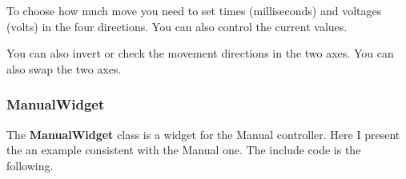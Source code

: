 To choose how much move you need to set times (milliseconds) and
voltages (volts) in the four directions. You can also control the
current values.

\begin{Shaded}
\begin{Highlighting}[]
\NormalTok{)}
\NormalTok{)}
\end{Highlighting}
\end{Shaded}

You can also invert or check the movement directions in the two axes.
You can also swap the two axes.

\begin{Shaded}
\begin{Highlighting}[]
\NormalTok{);}
\NormalTok{);}

\NormalTok{);}
\NormalTok{);}

\NormalTok{);}
\NormalTok{);}
\end{Highlighting}
\end{Shaded}

\hypertarget{manualwidget}{%
\subsubsection{ManualWidget}\label{manualwidget}}

The \textbf{ManualWidget} class is a widget for the Manual controller.
Here I present the an example consistent with the Manual one. The
include code is the following.

